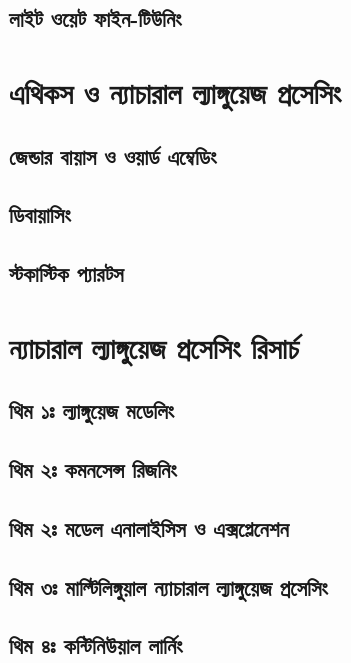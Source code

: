 \documentclass{article}[book]
\begin{document}
\subsection{লাইট ওয়েট ফাইন-টিউনিং}

\section{এথিকস ও ন্যাচারাল ল্যাঙ্গুয়েজ প্রসেসিং}
\subsection{জেন্ডার বায়াস ও ওয়ার্ড  এম্বেডিং}
\subsection{ডিবায়াসিং}
\subsection{স্টকাস্টিক প্যারটস}

\section{ন্যাচারাল ল্যাঙ্গুয়েজ প্রসেসিং রিসার্চ}
\subsection{থিম ১ঃ ল্যাঙ্গুয়েজ মডেলিং}
\subsection{থিম ২ঃ কমনসেন্স রিজনিং}
\subsection{থিম ২ঃ মডেল এনালাইসিস ও এক্সপ্লেনেশন}
\subsection{থিম ৩ঃ  মাল্টিলিঙ্গুয়াল ন্যাচারাল ল্যাঙ্গুয়েজ প্রসেসিং} 
\subsection{থিম ৪ঃ কন্টিনিউয়াল লার্নিং}




\end{document}
